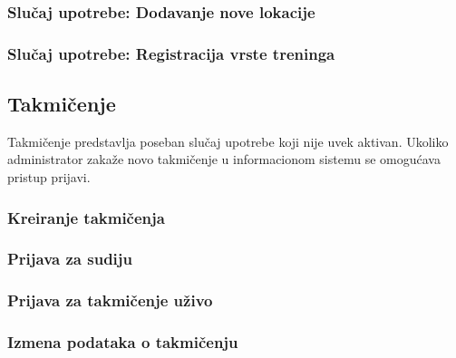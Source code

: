 \documentclass[a4paper]{article}
\begin{document}
\subsubsection{Slučaj upotrebe: Dodavanje nove lokacije}


\subsubsection{Slučaj upotrebe: Registracija vrste treninga}


\newpage
\subsection{Takmičenje}
Takmičenje predstavlja poseban slučaj upotrebe koji nije uvek aktivan. Ukoliko administrator zakaže novo takmičenje u informacionom sistemu se omogućava pristup prijavi. 

\subsubsection{Kreiranje takmičenja}

\subsubsection{Prijava za sudiju}

\subsubsection{Prijava za takmičenje uživo}


\subsubsection{Izmena podataka o takmičenju}

\end{document}
